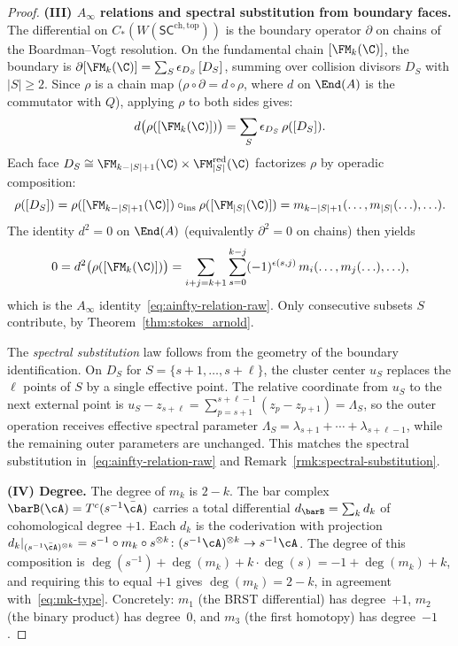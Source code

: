 \begin{proof}
\medskip
\textbf{(III) $A_\infty$ relations and spectral substitution from boundary faces.}
The differential on $C_\ast(W(\mathsf{SC}^{\mathrm{ch,top}}))$ is the boundary operator $\partial$ on chains of the Boardman--Vogt resolution. On the fundamental chain $[\FM_k(\C)]$, the boundary is $\partial[\FM_k(\C)] = \sum_S \epsilon_{D_S}\,[D_S]$, summing over collision divisors $D_S$ with $|S| \geq 2$. Since $\rho$ is a chain map ($\rho \circ \partial = d \circ \rho$, where $d$ on $\End(A)$ is the commutator with $Q$), applying $\rho$ to both sides gives:
\[
d\bigl(\rho([\FM_k(\C)])\bigr) = \sum_S \epsilon_{D_S}\, \rho([D_S]).
\]
Each face $D_S \cong \FM_{k-|S|+1}(\C) \times \FM_{|S|}^{\mathrm{red}}(\C)$ factorizes $\rho$ by operadic composition:
\[
\rho([D_S]) = \rho([\FM_{k-|S|+1}(\C)]) \circ_{\mathrm{ins}} \rho([\FM_{|S|}(\C)]) = m_{k-|S|+1}(\ldots, m_{|S|}(\ldots), \ldots).
\]
The identity $d^2 = 0$ on $\End(A)$ (equivalently $\partial^2 = 0$ on chains) then yields
\[
0 = d^2\bigl(\rho([\FM_k(\C)])\bigr) = \sum_{i+j=k+1}\sum_{s=0}^{k-j} (-1)^{\epsilon(s,j)}\, m_i(\ldots, m_j(\ldots), \ldots),
\]
which is the $A_\infty$ identity~\eqref{eq:ainfty-relation-raw}. Only
consecutive subsets $S$ contribute, by
Theorem~\ref{thm:stokes_arnold}.

The \emph{spectral substitution} law follows from the geometry of the boundary identification. On $D_S$ for $S = \{s{+}1,\ldots,s{+}\ell\}$, the cluster center $u_S$ replaces the $\ell$ points of $S$ by a single effective point. The relative coordinate from $u_S$ to the next external point is $u_S - z_{s+\ell} = \sum_{p=s+1}^{s+\ell-1}(z_p - z_{p+1}) = \Lambda_S$, so the outer operation receives effective spectral parameter $\Lambda_S = \lambda_{s+1} + \cdots + \lambda_{s+\ell-1}$, while the remaining outer parameters are unchanged. This matches the spectral substitution in~\eqref{eq:ainfty-relation-raw} and Remark~\ref{rmk:spectral-substitution}.

\medskip
\textbf{(IV) Degree.}
The degree of $m_k$ is $2 - k$. The bar complex $\barB(\cA) = T^c(s^{-1}\bar{\cA})$ carries a total differential $d_{\barB} = \sum_k d_k$ of cohomological degree $+1$. Each $d_k$ is the coderivation with projection
$d_k|_{(s^{-1}\bar{\cA})^{\otimes k}} = s^{-1} \circ m_k \circ s^{\otimes k}\colon (s^{-1}\cA)^{\otimes k} \to s^{-1}\cA$.
The degree of this composition is $\deg(s^{-1}) + \deg(m_k) + k\cdot\deg(s) = -1 + \deg(m_k) + k$, and requiring this to equal $+1$ gives $\deg(m_k) = 2 - k$, in agreement with~\eqref{eq:mk-type}. Concretely: $m_1$ (the BRST differential) has degree~$+1$, $m_2$ (the binary product) has degree~$0$, and $m_3$ (the first homotopy) has degree~$-1$.
\end{proof}


